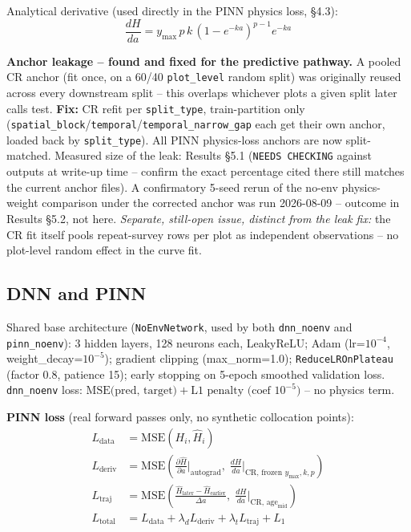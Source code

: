 \documentclass[11pt,a4paper]{report}
\begin{document}
Analytical derivative (used directly in the PINN physics loss, \S4.3):
\[
\frac{dH}{da} = y_{\max}\, p\, k\, \left(1-e^{-ka}\right)^{p-1} e^{-ka}
\]

\textbf{Anchor leakage -- found and fixed for the predictive pathway.} A pooled CR anchor (fit
once, on a 60/40 \texttt{plot\_level} random split) was originally reused across every downstream
split -- this overlaps whichever plots a given split later calls test.
\textbf{Fix:} CR refit per \texttt{split\_type}, train-partition only
(\texttt{spatial\_block}/\texttt{temporal}/\texttt{temporal\_narrow\_gap} each get their own
anchor, loaded back by \texttt{split\_type}). All PINN physics-loss anchors are now split-matched.
Measured size of the leak: Results \S5.1 (\texttt{NEEDS CHECKING} against outputs at
write-up time -- confirm the exact percentage cited there still matches the current anchor files).
A confirmatory 5-seed rerun of the no-env physics-weight comparison under the corrected anchor was
run 2026-08-09 -- outcome in Results \S5.2, not here.
\textit{Separate, still-open issue, distinct from the leak fix:} the CR fit itself pools
repeat-survey rows per plot as independent observations -- no plot-level random effect in the
curve fit.

\subsection*{DNN and PINN}

Shared base architecture (\texttt{NoEnvNetwork}, used by both \texttt{dnn\_noenv} and
\texttt{pinn\_noenv}): 3 hidden layers, 128 neurons each, LeakyReLU; Adam (lr=$10^{-4}$,
weight\_decay=$10^{-5}$); gradient clipping (max\_norm=1.0); \texttt{ReduceLROnPlateau} (factor
0.8, patience 15); early stopping on 5-epoch smoothed validation loss. \texttt{dnn\_noenv} loss:
$\text{MSE(pred, target)} + \text{L1 penalty (coef } 10^{-5}\text{)}$ -- no physics term.

\textbf{PINN loss} (real forward passes only, no synthetic collocation points):
\begin{align*}
L_{\text{data}} &= \text{MSE}(H_i, \hat H_i) \\
L_{\text{deriv}} &= \text{MSE}\!\left(\tfrac{\partial \hat H}{\partial a}\Big|_{\text{autograd}},\;
  \tfrac{dH}{da}\Big|_{\text{CR, frozen } y_{\max},k,p}\right) \\
L_{\text{traj}} &= \text{MSE}\!\left(\tfrac{\hat H_{\text{later}}-\hat H_{\text{earlier}}}{\Delta a},\;
  \tfrac{dH}{da}\Big|_{\text{CR, age}_{\text{mid}}}\right) \\
L_{\text{total}} &= L_{\text{data}} + \lambda_d L_{\text{deriv}} + \lambda_t L_{\text{traj}} + L_1
\end{align*}
\end{document}
